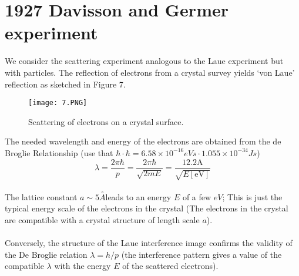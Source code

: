 \section{1927 Davisson and Germer experiment}
We consider the scattering experiment analogous to the Laue experiment but with particles. The reflection of electrons from a crystal survey yields `von Laue' reflection as sketched in Figure  7. 
\begin{figure}[ht]
    \centering
    \texttt{[image: 7.PNG]}
    \caption{Scattering of electrons on a crystal surface.}
    \label{fig:7}
\end{figure}
The needed wavelength and energy of the electrons are obtained from the de Broglie Relationship (use that $\hbar\cdot \hbar=6.58\times 10^{-16}eVs \cdot 1.055\times 10^{-34}Js$)
\\\begin{equation}
\lambda=\frac{2 \pi \hbar}{p}=\frac{2 \pi \hbar}{\sqrt{2 m E}}=\frac{12.2 \mathrm{A}}{\sqrt{E[\mathrm{eV}]}}
\end{equation}
\\
The lattice constant $a \sim5 \overset{\circ}{A} $leads to an energy $E$ of a few $eV$; This is just the typical energy scale of the electrons in the crystal (The electrons in the crystal are compatible with a crystal structure of length scale $a$).\\\\
Conversely, the structure of the Laue interference image confirms the validity of the De Broglie relation $\lambda = h/p$ (the interference pattern gives a value of the compatible $\lambda$ with the energy $E$ of the scattered electrons).
